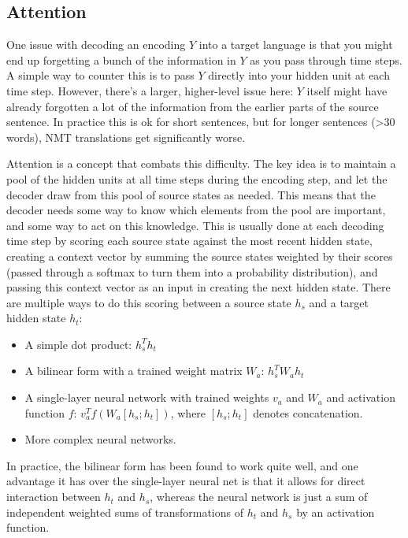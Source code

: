 \subsection{Attention}
One issue with decoding an encoding $Y$ into a target language is that you might end up forgetting a bunch of the information in $Y$ as you pass through time steps. A simple way to counter this is to pass $Y$ directly into your hidden unit at each time step. However, there's a larger, higher-level issue here: $Y$ itself might have already forgotten a lot of the information from the earlier parts of the source sentence. In practice this is ok for short sentences, but for longer sentences (>30 words), NMT translations get significantly worse.

Attention is a concept that combats this difficulty. The key idea is to maintain a pool of the hidden units at all time steps during the encoding step, and let the decoder draw from this pool of source states as needed. This means that the decoder needs some way to know which elements from the pool are important, and some way to act on this knowledge. This is usually done at each decoding time step by scoring each source state against the most recent hidden state, creating a context vector by summing the source states weighted by their scores (passed through a softmax to turn them into a probability distribution), and passing this context vector as an input in creating the next hidden state. There are multiple ways to do this scoring between a source state $h_s$ and a target hidden state $h_t$:
\begin{itemize}
\item A simple dot product: $h_s^T h_t$
\item A bilinear form with a trained weight matrix $W_a$: $h_s^TW_ah_t$
\item A single-layer neural network with trained weights $v_a$ and $W_a$ and activation function $f$: $v_a^Tf\left(W_a[h_s; h_t]\right)$, where $[h_s; h_t]$ denotes concatenation.
\item More complex neural networks.
\end{itemize}
In practice, the bilinear form has been found to work quite well, and one advantage it has over the single-layer neural net is that it allows for direct interaction between $h_t$ and $h_s$, whereas the neural network is just a sum of independent weighted sums of transformations of $h_t$ and $h_s$ by an activation function.


